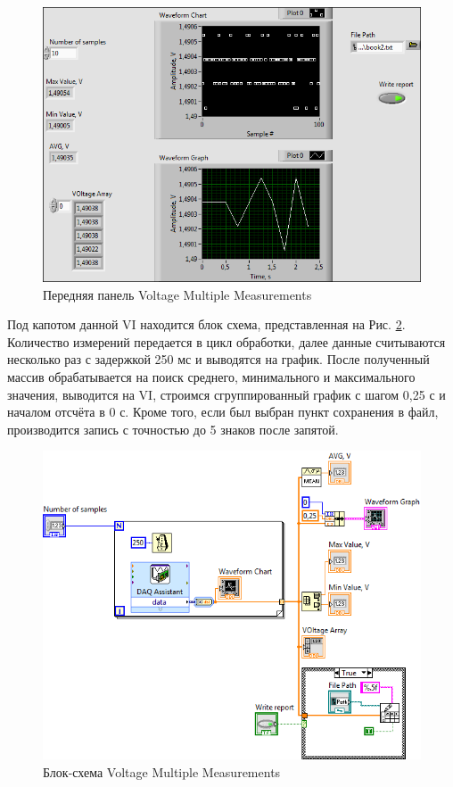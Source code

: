 \documentclass[a4paper,14pt]{article}
\begin{document}
\begin{figure}[H]
	\centering		
	\includegraphics[width=\linewidth]{image/vmm_vi}
	\caption{Передняя панель Voltage Multiple Measurements}\label{img:vmm_vi}
\end{figure}

Под капотом данной VI находится блок схема, представленная на Рис. \ref{img:vmm_schema}.
Количество измерений передается в цикл обработки, далее данные считываются несколько раз с задержкой 250 мс и выводятся на график.
После полученный массив обрабатывается на поиск среднего, минимального и максимального значения, выводится на VI, строимся сгруппированный график с шагом 0,25 с и началом отсчёта в 0 с.
Кроме того, если был выбран пункт сохранения в файл, производится запись с точностью до 5 знаков после запятой.

\begin{figure}[H]
	\centering		
	\includegraphics[width=\linewidth]{image/vmm_schema}
	\caption{Блок-схема Voltage Multiple Measurements}\label{img:vmm_schema}
\end{figure}
\end{document}
